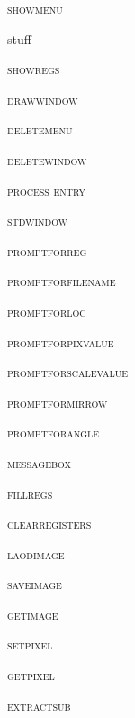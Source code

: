 \documentclass[pdftex, 11pt]{article}
\begin{document}
\begin{description}

	\item{\textsc{showmenu}}

		stuff

	\item{\textsc{showregs}}


	\item{\textsc{drawwindow}}


	\item{\textsc{deletemenu}}


	\item{\textsc{deletewindow}}


	\item{\textsc{process entry}}


	\item{\textsc{stdwindow}}


	\item{\textsc{promptforreg}}


	\item{\textsc{promptforfilename}}


	\item{\textsc{promptforloc}}


	\item{\textsc{promptforpixvalue}}


	\item{\textsc{promptforscalevalue}}


	\item{\textsc{promptformirrow}}


	\item{\textsc{promptforangle}}


	\item{\textsc{messagebox}}


	\item{\textsc{fillregs}}


	\item{\textsc{clearregisters}}


	\item{\textsc{laodimage}}


	\item{\textsc{saveimage}}


	\item{\textsc{getimage}}


	\item{\textsc{setpixel}}


	\item{\textsc{getpixel}}


	\item{\textsc{extractsub}}



\end{description}
\end{document}
